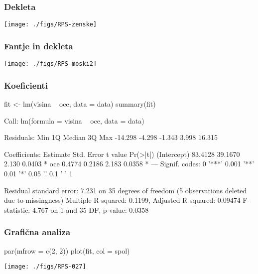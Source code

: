 \begin{frame}[fragile]
\frametitle{Dekleta}
\texttt{[image: ./figs/RPS-zenske]}
\end{frame}
\clearpage
{}
\begin{frame}[fragile]
\frametitle{Fantje in dekleta}
\texttt{[image: ./figs/RPS-moski2]}
\end{frame}

\begin{frame}[fragile]
\frametitle{Koeficienti}
\begin{Schunk}
\begin{Sinput}
  fit <- lm(visina ~ oce, data = data)
  summary(fit)
\end{Sinput}
\begin{Soutput}
Call:
lm(formula = visina ~ oce, data = data)

Residuals:
    Min      1Q  Median      3Q     Max 
-14.298  -4.298  -1.343   3.998  16.315 

Coefficients:
            Estimate Std. Error t value Pr(>|t|)  
(Intercept)  83.4128    39.1670   2.130   0.0403 *
oce           0.4774     0.2186   2.183   0.0358 *
---
Signif. codes:  0 '***' 0.001 '**' 0.01 '*' 0.05 '.' 0.1 ' ' 1 

Residual standard error: 7.231 on 35 degrees of freedom
  (5 observations deleted due to missingness)
Multiple R-squared: 0.1199,	Adjusted R-squared: 0.09474 
F-statistic: 4.767 on 1 and 35 DF,  p-value: 0.0358 
\end{Soutput}
\end{Schunk}
\end{frame}

\begin{frame}[fragile]
\frametitle{Grafična analiza}
\begin{Schunk}
\begin{Sinput}
  par(mfrow = c(2, 2))
  plot(fit, col = spol)
\end{Sinput}
\end{Schunk}
\texttt{[image: ./figs/RPS-027]}
\end{frame}



